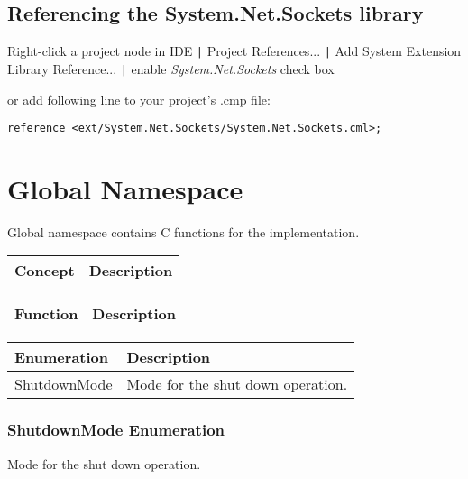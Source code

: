 \documentclass[a4paper,oneside,11.000000pt]{book}
\newcounter{subchapter}
\begin{document}
\section{Referencing the System.Net.Sockets library}

Right-click a project node in IDE \verb.|. Project References... \verb.|.
Add System Extension Library Reference... \verb.|.
enable \emph{System.Net.Sockets} check box

\begin{flushleft}
or add following line to your project's .cmp file:
\begin{verbatim}
reference <ext/System.Net.Sockets/System.Net.Sockets.cml>;
\end{verbatim}
\end{flushleft}
\hypertarget{global}{\chapter{Global Namespace}}
\begin{flushleft}
Global namespace contains C functions for the implementation.

\end{flushleft}
\clearpage
{}
\begin{flushleft}
\begin{supertabular}[l]{ll}
\textbf{Concept}
& \textbf{Description}
\\
\hline
\end{supertabular}

\end{flushleft}
\clearpage
\clearpage
\clearpage
\clearpage
\clearpage
\clearpage
\clearpage

\begin{flushleft}
\begin{supertabular}[l]{ll}
\textbf{Function}
& \textbf{Description}
\\
\hline
\end{supertabular}

\end{flushleft}
\clearpage
\clearpage
{}
\begin{flushleft}
\begin{supertabular}[l]{ll}
\textbf{Enumeration}
& \textbf{Description}
\\
\hline
\hyperlink{ShutdownMode}{ShutdownMode}
& Mode for the shut down operation.

\\
\end{supertabular}

\end{flushleft}
\clearpage
\hypertarget{ShutdownMode}{\subsection{ShutdownMode Enumeration}}
\begin{flushleft}
Mode for the shut down operation.

\end{flushleft}
\end{document}
